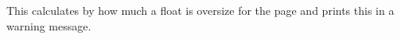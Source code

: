 % 
%
  \begin{macro}{\@largefloatcheck}
% 
    This calculates by how much a float is oversize for the page and
    prints this in a warning message.
%    
    \begin{teX}  
\def \@largefloatcheck{%
  \ifdim \ht\@currbox>\textheight
    \@tempdima -\textheight
    \advance \@tempdima \ht\@currbox
    \end{teX}
    \begin{teX}
    \@latex@warning {Float too large for page by \the\@tempdima}%
    \ht\@currbox \textheight
  \fi
}
    \end{teX}
  \end{macro}
%
%    
%
    \begin{teX}
\def\@dbflt#1{\@ifnextchar[{\@xdblfloat{#1}}{\@xdblfloat{#1}[tp]}}
\def\@xdblfloat#1[#2]{%
  \@xfloat{#1}[#2]\hsize\textwidth\linewidth\textwidth}
    \end{teX}
%
%
    \begin{teX}
    \end{teX}
%
%
    \begin{teX}
\def\@floatplacement{\global\@topnum\c@topnumber
   \global\@toproom \topfraction\@colht
   \global\@botnum  \c@bottomnumber
   \global\@botroom \bottomfraction\@colht
   \global\@colnum  \c@totalnumber
   \@fpmin   \floatpagefraction\@colht}
    \end{teX}
%
